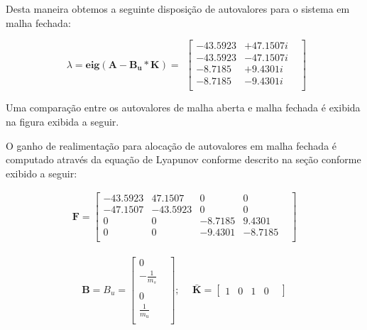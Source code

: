 Desta maneira obtemos a seguinte disposição de autovalores para o sistema em malha fechada:

\begin{equation} \label{eq:autovalores_malha_fechada}
        \begin{split}
             \lambda=\mathbf{eig(A-B_u*K)}=
        \end{split}
        \begin{bmatrix}
            -43.5923& + 47.1507i&\\
            -43.5923& - 47.1507i&\\
            -8.7185& + 9.4301i&\\
            -8.7185& - 9.4301i&\\
        \end{bmatrix}
    \end{equation}

Uma comparação entre os autovalores de malha aberta e malha fechada é exibida na figura exibida a seguir.
    
    O ganho de realimentação para alocação de autovalores em malha fechada é computado através da equação de Lyapunov conforme descrito na seção   conforme exibido a seguir:
    
    \begin{equation*} 
    \begin{split}
        \mathbf{F} =
        \begin{bmatrix}
            -43.5923 &  47.1507 &       0       & 0 & \\ 
            -47.1507 & -43.5923 &       0 &       0 & \\
                   0 &        0 & -8.7185 &  9.4301 & \\
                   0 &        0 & -9.4301 & -8.7185 & \\
        \end{bmatrix}
    \end{split}
    \end{equation*} 
 
    \begin{equation*} 
    \begin{split}
        \mathbf{B} = B_u = 
        \begin{bmatrix}
            0 & \\
            -\frac{1}{m_s}&\\ \\
            0 & \\
            \frac{1}{m_u} \\
        \end{bmatrix};\ \
    \end{split}
    \begin{split}
    \mathbf{\bar{K}} =
        \begin{bmatrix}
        1&0&1&0&
        \end{bmatrix}
    \end{split}
    \end{equation*} 
    
